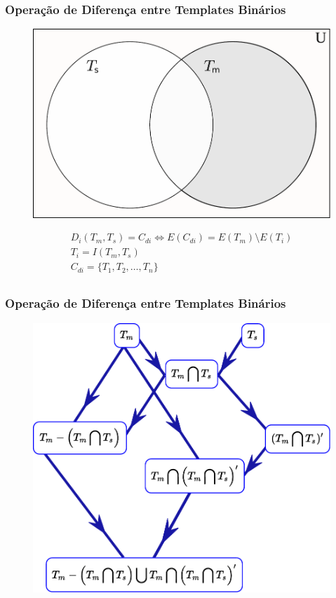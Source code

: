 \documentclass[aspectratio=43,hyperref={pdfpagelabels=false}]{beamer}
\begin{document}
  \begin{frame}
    \frametitle{Operação de Diferença entre Templates Binários}


    \begin{figure}[h!]
      \centering
      \includegraphics[width=.4\textwidth]{fig_complement2.pdf}
      \label{fig:complement}
    \end{figure}\begin{equation}
    \begin{split}
    D_i(T_m,T_s)= C_{di} \Leftrightarrow E(C_{di}) = E(T_m) \setminus E(T_i) \\
    T_i = I(T_m,T_s)\\
    C_{di} = \{T_1,T_2,\dots, T_n\}\\
    \end{split}
    \end{equation}
 \end{frame}


  \begin{frame}
    \frametitle{Operação de Diferença entre Templates Binários}
    \begin{figure}[h!]
      \centering
      \includegraphics[width=.6\textwidth]{grafico1.pdf}
    \end{figure}
 \end{frame}
\end{document}
